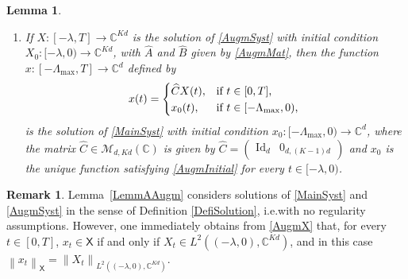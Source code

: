 \documentclass[10pt]{amsart}
\newcommand{\llbracket}{[\![}
\newcommand{\rrbracket}{]\!]}
\theoremstyle{plain}
\newtheorem{lemm}[theo]{Lemma}
\theoremstyle{definition}
\newtheorem{remk}[theo]{Remark}
\DeclareMathOperator{\id}{Id}
\newcommand{\norm}[1]{\left\lVert #1\right\lVert}
\providecommand{\ie}{i.e.}\providecommand{\etc}{etc.}\providecommand{\resp}{resp.}\providecommand{\cf}{cf.}
\begin{document}
\begin{lemm}
\begin{enumerate}
\begin{equation}
\begin{aligned}
&\hspace*{2cm}\text{(in particular, $\widehat A_k = 0$ if $k_j \neq k$ for all $j \in \llbracket 1, N\rrbracket$)},
\end{aligned}
\end{equation}
and with initial condition $X_0: [-\lambda, 0) \to \mathbb C^{K d}$ given by
\begin{equation}
\label{AugmInitial}
X_0(t) = \begin{pmatrix}
x_0(t) \\
x_0(t - \lambda) \\
x_0(t - 2\lambda) \\
\vdots \\
x_0(t - (K-1)\lambda) \\
\end{pmatrix}.
\end{equation}

\item If $X: [-\lambda, T] \to \mathbb C^{K d}$ is the solution of \eqref{AugmSyst} with initial condition $X_0: [-\lambda, 0) \to \mathbb C^{K d}$, with $\widehat A$ and $\widehat B$ given by \eqref{AugmMat}, then the function $x: [-\Lambda_{\max}, T] \to \mathbb C^d$ defined by
\[
x(t) =
\begin{dcases*}
\widehat C X(t), & if $t \in [0, T]$, \\
x_0(t), & if $t \in [-\Lambda_{\max}, 0)$,
\end{dcases*}
\]
is the solution of \eqref{MainSyst} with initial condition $x_0: [-\Lambda_{\max}, 0) \to \mathbb C^d$, where the matrix $\widehat C \in \mathcal M_{d, K d}(\mathbb C)$ is given by $\widehat C = \begin{pmatrix}\id_d & 0_{d, (K-1)d}\end{pmatrix}$ and $x_0$ is the unique function satisfying \eqref{AugmInitial} for every $t \in [-\lambda, 0)$.
\end{enumerate}
\end{lemm}

\begin{remk}
Lemma~\ref{LemmAAugm} considers solutions of \eqref{MainSyst} and \eqref{AugmSyst} in the sense of Definition \ref{DefiSolution}, \ie with no regularity assumptions. However, one immediately obtains from \eqref{AugmX} that, for every $t \in [0, T]$, $x_t \in \mathsf X$ if and only if $X_t \in L^2((-\lambda, 0), \mathbb C^{Kd})$, and in this case $\norm{x_t}_{\mathsf X} = \norm{X_t}_{L^2((-\lambda, 0), \mathbb C^{Kd})}$.
\end{remk}
\end{document}
